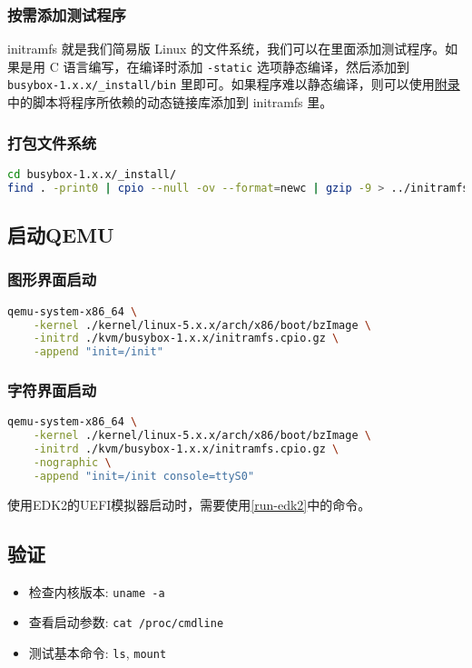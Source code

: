\subsubsection{按需添加测试程序}

initramfs 就是我们简易版 Linux 的文件系统，我们可以在里面添加测试程序。如果是用 C 语言编写，在编译时添加 \texttt{-static} 选项静态编译，然后添加到 \texttt{busybox-1.x.x/\_install/bin} 里即可。如果程序难以静态编译，则可以使用\hyperref[appendix:dynamic-library]{附录}中的脚本将程序所依赖的动态链接库添加到 initramfs 里。


\subsubsection{打包文件系统}
\begin{lstlisting}[language=bash]
cd busybox-1.x.x/_install/
find . -print0 | cpio --null -ov --format=newc | gzip -9 > ../initramfs.cpio.gz
\end{lstlisting}

\subsection{启动QEMU}
\subsubsection{图形界面启动}
\begin{lstlisting}[language=bash]
qemu-system-x86_64 \
    -kernel ./kernel/linux-5.x.x/arch/x86/boot/bzImage \
    -initrd ./kvm/busybox-1.x.x/initramfs.cpio.gz \
    -append "init=/init"
\end{lstlisting}

\subsubsection{字符界面启动}
\begin{lstlisting}[language=bash, showstringspaces=false]
qemu-system-x86_64 \
    -kernel ./kernel/linux-5.x.x/arch/x86/boot/bzImage \
    -initrd ./kvm/busybox-1.x.x/initramfs.cpio.gz \
    -nographic \
    -append "init=/init console=ttyS0"
\end{lstlisting}

使用EDK2的UEFI模拟器启动时，需要使用\ref{run-edk2}中的命令。

\subsection{验证}
\begin{itemize}
    \item 检查内核版本: \texttt{uname -a}
    \item 查看启动参数: \texttt{cat /proc/cmdline}
    \item 测试基本命令: \texttt{ls}, \texttt{mount}
\end{itemize}

